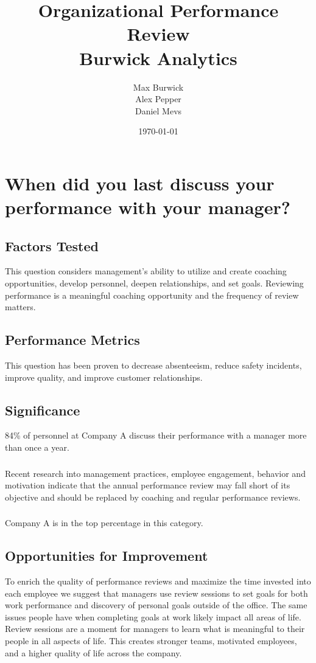 \documentclass[14pt]{extreport}
\title{\textbf{Organizational Performance Review}\\Burwick Analytics}
\author{Max Burwick\\
		Alex Pepper\\
		Daniel Mevs}
\date{\today}
\begin{document}




\newpage
\section*{When did you last discuss your performance with your manager?}

\subsection*{\centering Factors Tested}
This question considers management's ability to utilize and create coaching opportunities, develop personnel, deepen relationships, and set goals. Reviewing performance is a meaningful coaching opportunity and the frequency of review matters.
\subsection*{\centering Performance Metrics}
This question has been proven to decrease absenteeism, reduce
safety incidents, improve quality, and improve customer
relationships.

\subsection*{\centering Significance}
84\% of personnel at Company A discuss their performance with a manager more than once a year.
\subsubsection*{}
Recent research into management practices, employee engagement,
behavior and motivation indicate that the annual performance review
may fall short of its objective and should be replaced by coaching and
regular performance reviews.
\subsubsection*{}
Company A is in the top percentage in this category.

\subsection*{\centering Opportunities for Improvement}
To enrich the quality of performance reviews and maximize the time
invested into each employee we suggest that managers use review sessions to set goals for both work performance and discovery of personal goals outside of the office. The same issues people have when completing goals at work likely impact all areas of life. Review sessions are a moment for managers to learn what is meaningful to their people in all aspects of life. This creates stronger teams, motivated employees, and a higher quality of life across the company.
\end{document}
